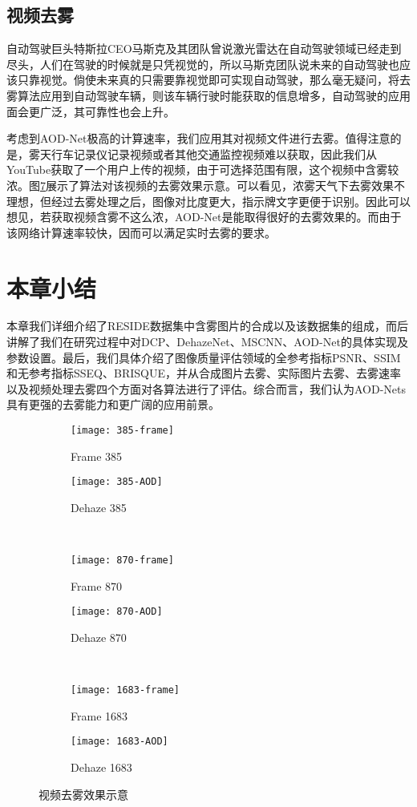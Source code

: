 \documentclass[a4paper, 12pt, oneside]{report}
\begin{document}
{\subsection{视频去雾\quad}
自动驾驶巨头特斯拉CEO马斯克及其团队曾说激光雷达在自动驾驶领域已经走到尽头，人们在驾驶的时候就是只凭视觉的，所以马斯克团队说未来的自动驾驶也应该只靠视觉。倘使未来真的只需要靠视觉即可实现自动驾驶，那么毫无疑问，将去雾算法应用到自动驾驶车辆，则该车辆行驶时能获取的信息增多，自动驾驶的应用面会更广泛，其可靠性也会上升。

考虑到AOD-Net极高的计算速率，我们应用其对视频文件进行去雾。值得注意的是，雾天行车记录仪记录视频或者其他交通监控视频难以获取，因此我们从YouTube\cite{ref27}获取了一个用户上传的视频，由于可选择范围有限，这个视频中含雾较浓。图\ref{fig:4.7}展示了算法对该视频的去雾效果示意。可以看见，浓雾天气下去雾效果不理想，但经过去雾处理之后，图像对比度更大，指示牌文字更便于识别。因此可以想见，若获取视频含雾不这么浓，AOD-Net是能取得很好的去雾效果的。而由于该网络计算速率较快，因而可以满足实时去雾的要求。

\section{本章小结\quad}
本章我们详细介绍了RESIDE数据集中含雾图片的合成以及该数据集的组成，而后讲解了我们在研究过程中对DCP、DehazeNet、MSCNN、AOD-Net的具体实现及参数设置。最后，我们具体介绍了图像质量评估领域的全参考指标PSNR、SSIM和无参考指标SSEQ、BRISQUE，并从合成图片去雾、实际图片去雾、去雾速率以及视频处理去雾四个方面对各算法进行了评估。综合而言，我们认为AOD-Nets具有更强的去雾能力和更广阔的应用前景。
\begin{figure}[H]
\begin{subfigure}{.5\textwidth}
  \centering
  \texttt{[image: 385-frame]}
  \caption{Frame 385}
  \label{fig:sfig5555555}
\end{subfigure} 
\begin{subfigure}{.5\textwidth}
  \centering
  \texttt{[image: 385-AOD]}
  \caption{Dehaze 385}
  \label{fig:sfig6666666}
\end{subfigure}\\
\begin{subfigure}{.5\textwidth}
  \centering
  \texttt{[image: 870-frame]}
  \caption{Frame 870}
  \label{fig:sfig1111111}
\end{subfigure}%
\begin{subfigure}{.5\textwidth}
  \centering
  \texttt{[image: 870-AOD]}
  \caption{Dehaze 870}
  \label{fig:sfig2222222}
\end{subfigure} \\
\begin{subfigure}{.5\textwidth}
  \centering
  \texttt{[image: 1683-frame]}
  \caption{Frame 1683}
  \label{fig:sfig3333333}
\end{subfigure} 
\begin{subfigure}{.5\textwidth}
  \centering
  \texttt{[image: 1683-AOD]}
  \caption{Dehaze 1683}
  \label{fig:sfig4444444}
\end{subfigure}
\caption{视频去雾效果示意}
\label{fig:4.7}
\end{figure}

}
\end{document}
